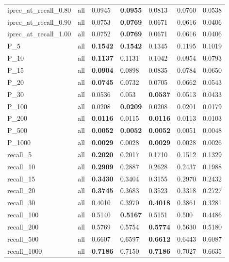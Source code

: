 \begin{table}[tbp]
\begin{tabular}{|l|l|l|l|l|l|l|}
        iprec\_at\_recall\_0.80 & all & 0.0945 & \textbf{0.0955} & 0.0813 & 0.0760 & 0.0538  \\ 
        iprec\_at\_recall\_0.90 & all & 0.0753 & \textbf{0.0769} & 0.0671 & 0.0616 & 0.0406  \\ 
        iprec\_at\_recall\_1.00 & all & 0.0752 & \textbf{0.0769} & 0.0671 & 0.0616 & 0.0406  \\ \midrule
        P\_5 & all & \textbf{0.1542} & \textbf{0.1542} & 0.1345 & 0.1195 & 0.1019  \\ 
        P\_10 & all & \textbf{0.1137} & 0.1131 & 0.1042 & 0.0954 & 0.0793  \\ 
        P\_15 & all & \textbf{0.0904} & 0.0898 & 0.0835 & 0.0784 & 0.0650  \\ 
        P\_20 & all & \textbf{0.0745} & 0.0732 & 0.0705 & 0.0662 & 0.0543  \\ 
        P\_30 & all & 0.0536 & 0.053 & \textbf{0.0537} & 0.0513 & 0.0433  \\ 
        P\_100 & all & 0.0208 & \textbf{0.0209} & 0.0208 & 0.0201 & 0.0179  \\ 
        P\_200 & all & \textbf{0.0116} & 0.0115 & \textbf{0.0116} & 0.0113 & 0.0103  \\ 
        P\_500 & all &\textbf{ 0.0052} & \textbf{0.0052} & \textbf{0.0052} & 0.0051 & 0.0048  \\ 
        P\_1000 & all & \textbf{0.0029} & 0.0028 & \textbf{0.0029} & 0.0028 & 0.0026  \\ \midrule
        recall\_5 & all & \textbf{0.2020} & 0.2017 & 0.1710 & 0.1512 & 0.1329  \\ 
        recall\_10 & all & \textbf{0.2909} & 0.2887 & 0.2628 & 0.2437 & 0.1988  \\ 
        recall\_15 & all & \textbf{0.3430} & 0.3404 & 0.3155 & 0.2970 & 0.2432  \\ 
        recall\_20 & all & \textbf{0.3745} & 0.3683 & 0.3523 & 0.3318 & 0.2727  \\ 
        recall\_30 & all & 0.4010 & 0.3970 & \textbf{0.4018} & 0.3861 & 0.3281  \\ 
        recall\_100 & all & 0.5140 & \textbf{0.5167} & 0.5151 & 0.500 & 0.4486  \\ 
        recall\_200 & all & 0.5769 & 0.5754 & \textbf{0.5774} & 0.5630 & 0.5180  \\ 
        recall\_500 & all & 0.6607 & 0.6597 & \textbf{0.6612} & 0.6443 & 0.6087  \\ 
        recall\_1000 & all & \textbf{0.7186} & 0.7150 & \textbf{0.7186} & 0.7027 & 0.6635  \\ 
        \bottomrule
    \end{tabular}
\end{table}

